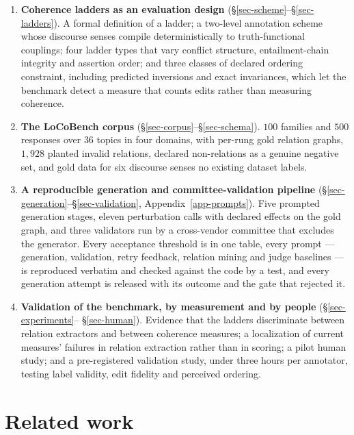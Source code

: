 \begin{enumerate}[leftmargin=1.6em,itemsep=2pt,topsep=3pt]
\item \textbf{Coherence ladders as an evaluation design} (\S\ref{sec-scheme}--\S\ref{sec-ladders}). A
  formal definition of a ladder; a two-level annotation scheme whose discourse senses compile
  deterministically to truth-functional couplings; four ladder types that vary conflict structure,
  entailment-chain integrity and assertion order; and three classes of declared ordering constraint,
  including predicted inversions and exact invariances, which let the benchmark detect a measure that
  counts edits rather than measuring coherence.
\item \textbf{The LoCoBench corpus} (\S\ref{sec-corpus}--\S\ref{sec-schema}). $100$ families and
  $500$ responses over $36$ topics in four domains, with per-rung gold relation graphs, $1{,}928$ planted
  invalid relations, declared non-relations as a genuine negative set, and gold data for six discourse
  senses no existing dataset labels.
\item \textbf{A reproducible generation and committee-validation pipeline}
  (\S\ref{sec-generation}--\S\ref{sec-validation}, Appendix~\ref{app-prompts}). Five prompted generation
  stages, eleven perturbation calls with declared effects on the gold graph, and three validators run by a
  cross-vendor committee that excludes the generator. Every acceptance threshold is in one table, every
  prompt --- generation, validation, retry feedback, relation mining and judge baselines --- is reproduced
  verbatim and checked against the code by a test, and every generation attempt is released with its
  outcome and the gate that rejected it.
\item \textbf{Validation of the benchmark, by measurement and by people} (\S\ref{sec-experiments}--%
  \S\ref{sec-human}). Evidence that the ladders discriminate between relation extractors and between
  coherence measures; a localization of current measures' failures in relation extraction rather than in
  scoring; a pilot human study; and a pre-registered validation study, under three hours per annotator, testing label validity,
  edit fidelity and perceived ordering.
\end{enumerate}

\section{Related work}
\label{sec-related}

